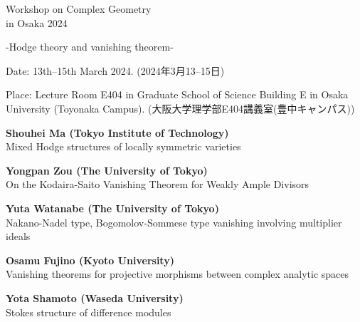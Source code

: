 \documentclass[dvipdfmx,a4paper,12pt]{article}
\theoremstyle{plain} %
\theoremstyle{definition} %
\begin{document}
\begin{center}
  {\Huge Workshop on Complex Geometry \\ in Osaka 2024}
 
  {\Large -Hodge theory and vanishing theorem-}
  \end{center}
  
\vskip5mm
\begin{flushleft}
{ Date: 13th--15th March 2024. (2024年3月13--15日)}


{Place: Lecture Room E404 in Graduate School of Science Building E in Osaka University (Toyonaka Campus).}
{(大阪大学理学部E404講義室(豊中キャンパス))}

\end{flushleft}




\vskip8mm
\vskip3mm

\vskip1mm
{\bf Shouhei Ma (Tokyo Institute of Technology)}\\
Mixed Hodge structures of locally symmetric varieties
\vskip3mm

{\bf Yongpan Zou (The University of Tokyo)}\\
On the Kodaira-Saito Vanishing Theorem for Weakly Ample Divisors
\vskip3mm

{\bf Yuta Watanabe (The University of Tokyo)}\\
Nakano-Nadel type, Bogomolov-Sommese type vanishing involving multiplier ideals

\vskip5mm

\vskip1mm
{\bf Osamu Fujino (Kyoto University) }\\
Vanishing theorems for projective morphisms between complex analytic spaces 

\vskip3mm
{\bf Yota Shamoto (Waseda University) }\\
Stokes structure of difference modules
\end{document}
